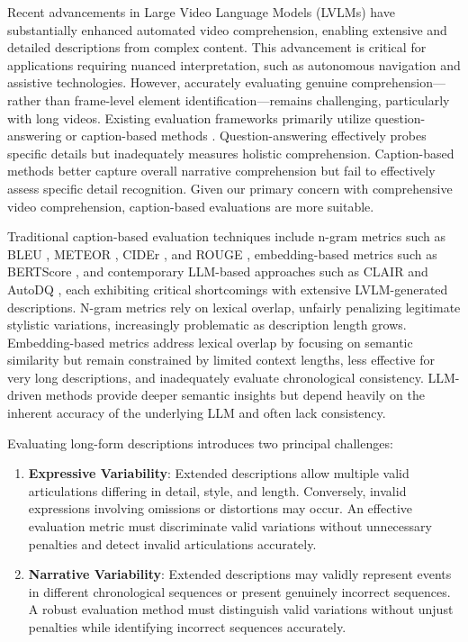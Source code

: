 \documentclass[letterpaper]{article} %
\begin{document}
Recent advancements in Large Video Language Models (LVLMs) \citep{Yuan2025Tarsier2,Shen2025LongVU,Ataallah2024Goldfish,Chen2025LongVILA} have substantially enhanced automated video comprehension, enabling extensive and detailed descriptions from complex content. This advancement is critical for applications requiring nuanced interpretation, such as autonomous navigation and assistive technologies. However, accurately evaluating genuine comprehension—rather than frame-level element identification—remains challenging, particularly with long videos. Existing evaluation frameworks primarily utilize question-answering or caption-based methods \citep{wu2024longvideobench,ataallah2024infinibench,mangalam2023egoschema,zhou2025mlvu}. Question-answering effectively probes specific details but inadequately measures holistic comprehension. Caption-based methods better capture overall narrative comprehension but fail to effectively assess specific detail recognition. Given our primary concern with comprehensive video comprehension, caption-based evaluations are more suitable.

Traditional caption-based evaluation techniques include n-gram metrics such as BLEU \citep{p:02}, METEOR \citep{bl:05}, CIDEr \citep{v:15}, and ROUGE \citep{l:04}, embedding-based metrics such as BERTScore \citep{z:20}, and contemporary LLM-based approaches such as CLAIR \citep{chan:23} and AutoDQ \citep{wyzs:24}, each exhibiting critical shortcomings with extensive LVLM-generated descriptions. N-gram metrics rely on lexical overlap, unfairly penalizing legitimate stylistic variations, increasingly problematic as description length grows. Embedding-based metrics address lexical overlap by focusing on semantic similarity but remain constrained by limited context lengths, less effective for very long descriptions, and inadequately evaluate chronological consistency. LLM-driven methods provide deeper semantic insights but depend heavily on the inherent accuracy of the underlying LLM and often lack consistency.

Evaluating long-form descriptions introduces two principal challenges:
\begin{enumerate}
\item \textbf{Expressive Variability}: Extended descriptions allow multiple valid articulations differing in detail, style, and length. Conversely, invalid expressions involving omissions or distortions may occur. An effective evaluation metric must discriminate valid variations without unnecessary penalties and detect invalid articulations accurately.
\item \textbf{Narrative Variability}: Extended descriptions may validly represent events in different chronological sequences or present genuinely incorrect sequences. A robust evaluation method must distinguish valid variations without unjust penalties while identifying incorrect sequences accurately.
\end{enumerate}
\end{document}
